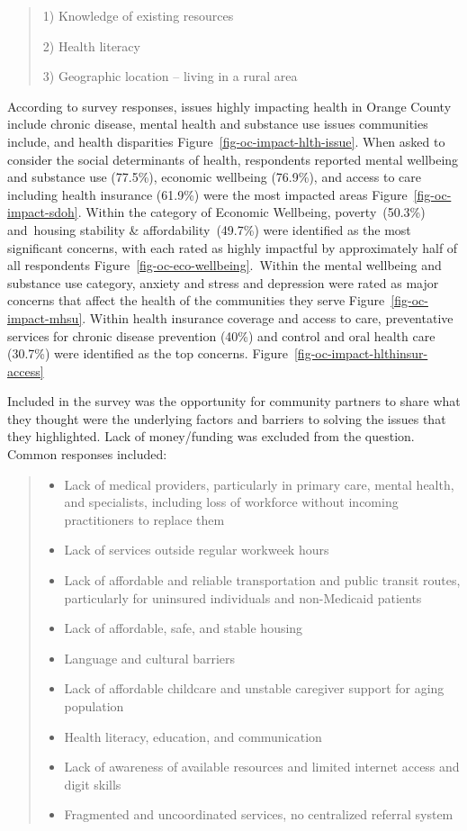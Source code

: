\documentclass[
  english,
  letterpaper,
]{report}
\begin{document}
\begin{quote}
1) Knowledge of existing resources

2) Health literacy

3) Geographic location -- living in a rural area
\end{quote}

According to survey responses, issues highly impacting health in Orange
County include chronic disease, mental health and substance use issues
communities include, and health disparities
Figure~\ref{fig-oc-impact-hlth-issue}. When asked to consider the social
determinants of health, respondents reported mental wellbeing and
substance use (77.5\%), economic wellbeing (76.9\%), and access to care
including health insurance (61.9\%) were the most impacted areas
Figure~\ref{fig-oc-impact-sdoh}. Within the category of Economic
Wellbeing, poverty~(50.3\%) and~housing stability \&
affordability~(49.7\%) were identified as the most significant concerns,
with each rated as highly impactful by approximately half of all
respondents Figure~\ref{fig-oc-eco-wellbeing}.~Within the mental
wellbeing and substance use category, anxiety and stress and depression
were rated as major concerns that affect the health of the communities
they serve Figure~\ref{fig-oc-impact-mhsu}. Within health insurance
coverage and access to care, preventative services for chronic disease
prevention (40\%) and control and oral health care (30.7\%) were
identified as the top concerns.
Figure~\ref{fig-oc-impact-hlthinsur-access}

Included in the survey was the opportunity for community partners to
share what they thought were the underlying factors and barriers to
solving the issues that they highlighted. Lack of money/funding was
excluded from the question. Common responses included:

\begin{quote}
\begin{itemize}
\item
  Lack of medical providers, particularly in primary care, mental
  health, and specialists, including loss of workforce without incoming
  practitioners to replace them
\item
  Lack of services outside regular workweek hours
\item
  Lack of affordable and reliable transportation and public transit
  routes, particularly for uninsured individuals and non-Medicaid
  patients
\item
  Lack of affordable, safe, and stable housing
\item
  Language and cultural barriers
\item
  Lack of affordable childcare and unstable caregiver support for aging
  population
\item
  Health literacy, education, and communication
\item
  Lack of awareness of available resources and limited internet access
  and digit skills
\item
  Fragmented and uncoordinated services, no centralized referral system
\end{itemize}
\end{quote}
\end{document}
